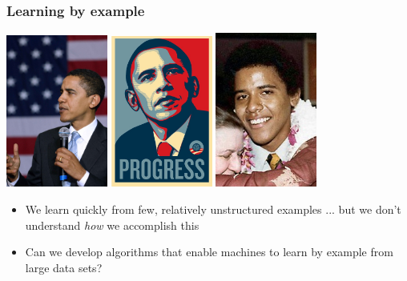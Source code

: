 \documentclass[xcolor=dvipsnames, 9pt]{beamer}
\begin{document}
\begin{frame}
  \frametitle{Learning by example}

    \begin{center}
      \includegraphics[width=0.25\textwidth]{obama1.png}
      \includegraphics[width=0.25\textwidth]{obama2.png}
      \includegraphics[width=0.25\textwidth]{obama4.png}
    \end{center}

    \begin{itemize}
      \pause
      \item We learn quickly from few, relatively unstructured examples
       ... but we don't understand {\it how} we accomplish this
      \item \alert<2>{Can we develop algorithms that enable machines
        to learn by example from large data sets?}
    \end{itemize}

\end{frame}
\end{document}
